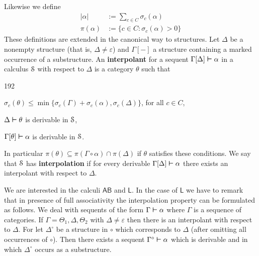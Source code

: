 Likewise we define
\begin{align}
| \alpha | & := \sum_{c \in C} \sigma_c(\alpha) \\
\pi(\alpha) & := \{c \in C : \sigma_c(\alpha) > 0\}
\end{align}
These definitions are extended in the canonical way to
structures. Let $\Delta$ be a nonempty structure (that is, $\Delta \neq
\varepsilon$) and $\Gamma[-]$ a structure containing a marked
occurrence of a substructure. An \textbf{interpolant} %
for a sequent $\Gamma[\Delta] \boldsymbol{\vdash} \alpha$ in a calculus
$\mathcal{S}$ with respect to  $\Delta$ is a category $\theta$ such that
\begin{dingautolist}{192}
\item $\sigma_c(\theta) \leq \min \{\sigma_c(\Gamma) +
        \sigma_c(\alpha),\sigma_c(\Delta)\}$, for all $c \in C$,
\item $\Delta \boldsymbol{\vdash} \theta$ is derivable in $\mathcal{S}$,
\item $\Gamma[\theta] \boldsymbol{\vdash} \alpha$ is derivable in $\mathcal{S}$.
\end{dingautolist}
In particular $\pi(\theta) \subseteq \pi(\Gamma \circ \alpha) \cap 
\pi(\Delta)$ if $\theta$ satisfies these conditions. We say that 
$\mathcal{S}$ has \textbf{interpolation} %
if for every derivable $\Gamma[\Delta] \boldsymbol{\vdash} \alpha$ there
exists an interpolant with respect to $\Delta$.

We are interested in the calculi $\mathsf{AB}$ and $\mathsf{L}$.
In the case of $\mathsf{L}$ we have to remark that in presence
of full associativity the interpolation property can be
formulated as follows. We deal with sequents of the form
$\Gamma \boldsymbol{\vdash} \alpha$ where $\Gamma$ is a sequence of categories.
If $\Gamma = \Theta_1, \Delta, \Theta_2$ with $\Delta \neq
\varepsilon$ then there is an interpolant with respect to
$\Delta$. For let $\Delta^{\circ}$ be a structure in $\circ$
which corresponds to $\Delta$ (after omitting all occurrences of
$\circ$). Then there exists a sequent $\Gamma^{\circ} \boldsymbol{\vdash} \alpha$
which is derivable and in which $\Delta^{\circ}$ occurs as a
substructure.

